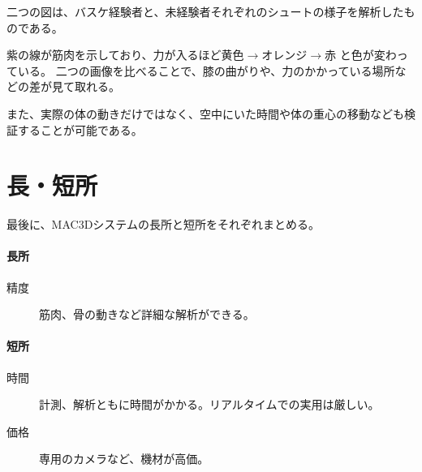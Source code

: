 \documentclass{jsarticle}
\begin{document}
        二つの図は、バスケ経験者と、未経験者それぞれのシュートの様子を解析したものである。

        紫の線が筋肉を示しており、力が入るほど黄色$\rightarrow$オレンジ$\rightarrow$赤
        と色が変わっている。
        二つの画像を比べることで、膝の曲がりや、力のかかっている場所などの差が見て取れる。

        また、実際の体の動きだけではなく、空中にいた時間や体の重心の移動なども検証することが可能である。

    \section{長・短所}
        最後に、MAC3Dシステムの長所と短所をそれぞれまとめる。

        \paragraph{長所}
            \begin{description}
                \item[精度] 筋肉、骨の動きなど詳細な解析ができる。
            \end{description}

        \paragraph{短所}
            \begin{description}
                \item[時間] 計測、解析ともに時間がかかる。リアルタイムでの実用は厳しい。
                \item[価格] 専用のカメラなど、機材が高価。
            \end{description}
\end{document}
